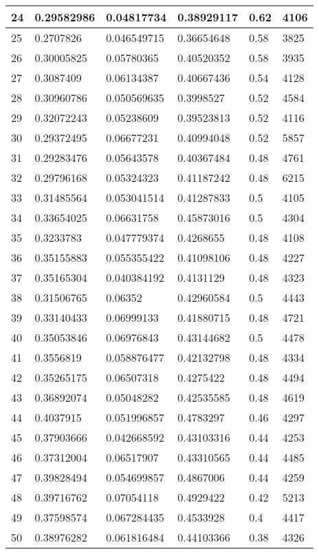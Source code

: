 \begin{longtable}{|l|l|l|l|l|l|}
24 & 0.29582986 & 0.04817734 & 0.38929117 & 0.62 & 4106 \\ \hline 
25 & 0.2707826 & 0.046549715 & 0.36654648 & 0.58 & 3825 \\ \hline 
26 & 0.30005825 & 0.05780365 & 0.40520352 & 0.58 & 3935 \\ \hline 
27 & 0.3087409 & 0.06134387 & 0.40667436 & 0.54 & 4128 \\ \hline 
28 & 0.30960786 & 0.050569635 & 0.3998527 & 0.52 & 4584 \\ \hline 
29 & 0.32072243 & 0.05238609 & 0.39523813 & 0.52 & 4116 \\ \hline 
30 & 0.29372495 & 0.06677231 & 0.40994048 & 0.52 & 5857 \\ \hline 
31 & 0.29283476 & 0.05643578 & 0.40367484 & 0.48 & 4761 \\ \hline 
32 & 0.29796168 & 0.05324323 & 0.41187242 & 0.48 & 6215 \\ \hline 
33 & 0.31485564 & 0.053041514 & 0.41287833 & 0.5 & 4105 \\ \hline 
34 & 0.33654025 & 0.06631758 & 0.45873016 & 0.5 & 4304 \\ \hline 
35 & 0.3233783 & 0.047779374 & 0.4268655 & 0.48 & 4108 \\ \hline 
36 & 0.35155883 & 0.055355422 & 0.41098106 & 0.48 & 4227 \\ \hline 
37 & 0.35165304 & 0.040384192 & 0.4131129 & 0.48 & 4323 \\ \hline 
38 & 0.31506765 & 0.06352 & 0.42960584 & 0.5 & 4443 \\ \hline 
39 & 0.33140433 & 0.06999133 & 0.41880715 & 0.48 & 4721 \\ \hline 
40 & 0.35053846 & 0.06976843 & 0.43144682 & 0.5 & 4478 \\ \hline 
41 & 0.3556819 & 0.058876477 & 0.42132798 & 0.48 & 4334 \\ \hline 
42 & 0.35265175 & 0.06507318 & 0.4275422 & 0.48 & 4494 \\ \hline 
43 & 0.36892074 & 0.05048282 & 0.42535585 & 0.48 & 4619 \\ \hline 
44 & 0.4037915 & 0.051996857 & 0.4783297 & 0.46 & 4297 \\ \hline 
45 & 0.37903666 & 0.042668592 & 0.43103316 & 0.44 & 4253 \\ \hline 
46 & 0.37312004 & 0.06517907 & 0.43310565 & 0.44 & 4485 \\ \hline 
47 & 0.39828494 & 0.054699857 & 0.4867006 & 0.44 & 4259 \\ \hline 
48 & 0.39716762 & 0.07054118 & 0.4929422 & 0.42 & 5213 \\ \hline 
49 & 0.37598574 & 0.067284435 & 0.4533928 & 0.4 & 4417 \\ \hline 
50 & 0.38976282 & 0.061816484 & 0.44103366 & 0.38 & 4326 \\ \hline 
\end{longtable}
